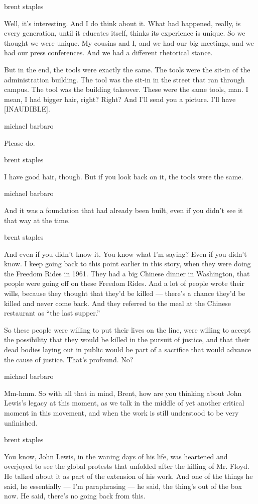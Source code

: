 brent staples

Well, it's interesting. And I do think about it. What had happened,
really, is every generation, until it educates itself, thinks its
experience is unique. So we thought we were unique. My cousins and I,
and we had our big meetings, and we had our press conferences. And we
had a different rhetorical stance.

But in the end, the tools were exactly the same. The tools were the
sit-in of the administration building. The tool was the sit-in in the
street that ran through campus. The tool was the building takeover.
These were the same tools, man. I mean, I had bigger hair, right? Right?
And I'll send you a picture. I'll have {[}INAUDIBLE{]}.

michael barbaro

Please do.

brent staples

I have good hair, though. But if you look back on it, the tools were the
same.

michael barbaro

And it was a foundation that had already been built, even if you didn't
see it that way at the time.

brent staples

And even if you didn't know it. You know what I'm saying? Even if you
didn't know. I keep going back to this point earlier in this story, when
they were doing the Freedom Rides in 1961. They had a big Chinese dinner
in Washington, that people were going off on these Freedom Rides. And a
lot of people wrote their wills, because they thought that they'd be
killed --- there's a chance they'd be killed and never come back. And
they referred to the meal at the Chinese restaurant as ``the last
supper.''

So these people were willing to put their lives on the line, were
willing to accept the possibility that they would be killed in the
pursuit of justice, and that their dead bodies laying out in public
would be part of a sacrifice that would advance the cause of justice.
That's profound. No?

michael barbaro

Mm-hmm. So with all that in mind, Brent, how are you thinking about John
Lewis's legacy at this moment, as we talk in the middle of yet another
critical moment in this movement, and when the work is still understood
to be very unfinished.

brent staples

You know, John Lewis, in the waning days of his life, was heartened and
overjoyed to see the global protests that unfolded after the killing of
Mr. Floyd. He talked about it as part of the extension of his work. And
one of the things he said, he essentially --- I'm paraphrasing --- he
said, the thing's out of the box now. He said, there's no going back
from this.

